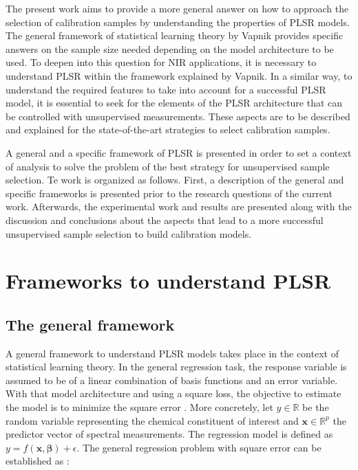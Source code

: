 \documentclass[journal=ancham,manuscript=article]{achemso}
\begin{document}
The present work aims to provide a more general answer on how to approach the selection of calibration samples by understanding the properties of PLSR models. The general framework of statistical learning theory by Vapnik \cite{Vapnik2019, Vapnik2000} provides specific answers on the sample size needed depending on the model architecture to be used. To deepen into this question for NIR applications, it is necessary to understand PLSR within the framework explained by Vapnik. In a similar way, to understand the required features to take into account for a successful PLSR model, it is essential to seek for the elements of the PLSR architecture that can be controlled with unsupervised measurements. These aspects are to be described and explained for the state-of-the-art strategies to select calibration samples.

A general and a specific framework of PLSR is presented in order to set a context of analysis to solve the problem of the best strategy for unsupervised sample selection. Te work is organized as follows. First, a description of the general and specific frameworks is presented prior to the research questions of the current work. Afterwards, the experimental work and results are presented along with the discussion and conclusions about the aspects that lead to a more successful unsupervised sample selection to build calibration models.


\section{Frameworks to understand PLSR}

\subsection{The general framework}

A general framework to understand PLSR models takes place in the context of statistical learning theory. In the general regression task, the response variable is assumed to be of a linear combination of basis functions and an error variable. With that model architecture and using a square loss, the objective to estimate the model is to minimize the square error \cite{Vapnik2019}. More concretely, let $y \in \mathbb{R}$ be the random variable representing the chemical constituent of interest and   $\mathbf{x} \in \mathbb{R}^{p}$ the predictor vector of spectral measurements. The regression model is defined as $ y = f(\mathbf{x}, \boldsymbol{\beta}) + \epsilon$.  The general regression problem with square error can be established as \cite{Vapnik2000}:
\end{document}
